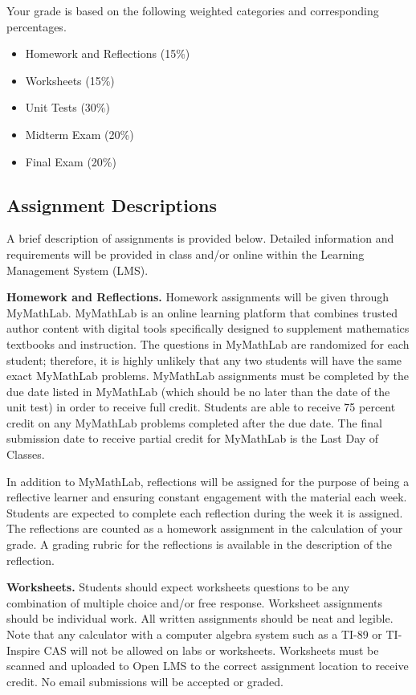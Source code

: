 \documentclass{article}
\begin{document}
Your grade is based on the following weighted categories and corresponding percentages.

\begin{itemize}
\item Homework and Reflections (15\%)
\item Worksheets (15\%)
\item Unit Tests (30\%)
\item Midterm Exam (20\%)
\item Final Exam (20\%)
\end{itemize}

\subsection{Assignment Descriptions}

A brief description of assignments is provided below. Detailed information and requirements will be provided in class and/or online within the Learning Management System (LMS).

\textbf{Homework and Reflections.} Homework assignments will be given through MyMathLab. MyMathLab is an online learning platform that combines trusted author content with digital tools specifically designed to supplement mathematics textbooks and instruction. The questions in MyMathLab are randomized for each student; therefore, it is highly unlikely that any two students will have the same exact MyMathLab problems. MyMathLab assignments must be completed by the due date listed in MyMathLab (which should be no later than the date of the unit test) in order to receive full credit. Students are able to receive 75 percent credit on any MyMathLab problems completed after the due date. The final submission date to receive partial credit for MyMathLab is the Last Day of Classes.

In addition to MyMathLab, reflections will be assigned for the purpose of being a reflective learner and ensuring constant engagement with the material each week. Students are expected to complete each reflection during the week it is assigned. The reflections are counted as a homework assignment in the calculation of your grade. A grading rubric for the reflections is available in the description of the reflection.

\textbf{Worksheets.} Students should expect worksheets questions to be any combination of multiple choice and/or free response. Worksheet assignments should be individual work. All written assignments should be neat and legible. Note that any calculator with a computer algebra system such as a TI-89 or TI-Inspire CAS will not be allowed on labs or worksheets. Worksheets must be scanned and uploaded to Open LMS to the correct assignment location to receive credit. No email submissions will be accepted or graded.
\end{document}
